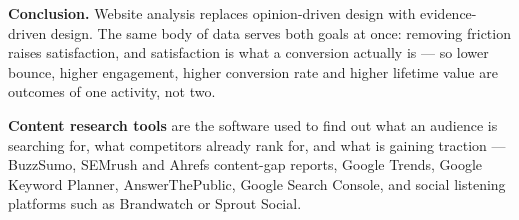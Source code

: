 \begin{qlist}
\textbf{Conclusion.} Website analysis replaces opinion-driven design with
evidence-driven design. The same body of data serves both goals at once:
removing friction raises satisfaction, and satisfaction is what a conversion
actually is --- so lower bounce, higher engagement, higher conversion rate and
higher lifetime value are outcomes of one activity, not two.

\textbf{Content research tools} are the software used to find out what an
audience is searching for, what competitors already rank for, and what is
gaining traction --- BuzzSumo, SEMrush and Ahrefs content-gap reports, Google
Trends, Google Keyword Planner, AnswerThePublic, Google Search Console, and
social listening platforms such as Brandwatch or Sprout Social.


\end{qlist}
